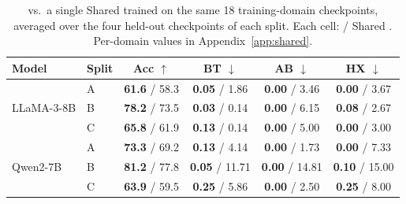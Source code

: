 \begin{table}[t]
\caption{\method{} vs.\ a single Shared \ssn{} trained on the same 18 training-domain checkpoints, averaged over the four held-out checkpoints of each split. Each cell: \method{} / Shared \ssn{}. Per-domain values in Appendix~\ref{app:shared}.}
\label{tab:shared}
\centering
\small
\setlength{\tabcolsep}{5pt}
\begin{tabular}{@{}llcccc@{}}
\toprule
\textbf{Model} & \textbf{Split} & \textbf{Acc} $\uparrow$ & \textbf{BT} $\downarrow$ & \textbf{AB} $\downarrow$ & \textbf{HX} $\downarrow$ \\
\midrule
\multirow{3}{*}{LLaMA-3-8B}
 & A & \textbf{61.6} / 58.3 & \textbf{0.05} / 1.86 & \textbf{0.00} / 3.46 & \textbf{0.00} / 3.67 \\
 & B & \textbf{78.2} / 73.5 & \textbf{0.03} / 0.14 & \textbf{0.00} / 6.15 & \textbf{0.08} / 2.67 \\
 & C & \textbf{65.8} / 61.9 & \textbf{0.13} / 0.14 & \textbf{0.00} / 5.00 & \textbf{0.00} / 3.00 \\
\midrule
\multirow{3}{*}{Qwen2-7B}
 & A & \textbf{73.3} / 69.2 & \textbf{0.13} / 4.14 & \textbf{0.00} / 1.73 & \textbf{0.00} / 7.33 \\
 & B & \textbf{81.2} / 77.8 & \textbf{0.05} / 11.71 & \textbf{0.00} / 14.81 & \textbf{0.10} / 15.00 \\
 & C & \textbf{63.9} / 59.5 & \textbf{0.25} / 5.86 & \textbf{0.00} / 2.50 & \textbf{0.25} / 8.00 \\
\bottomrule
\end{tabular}
\end{table}
